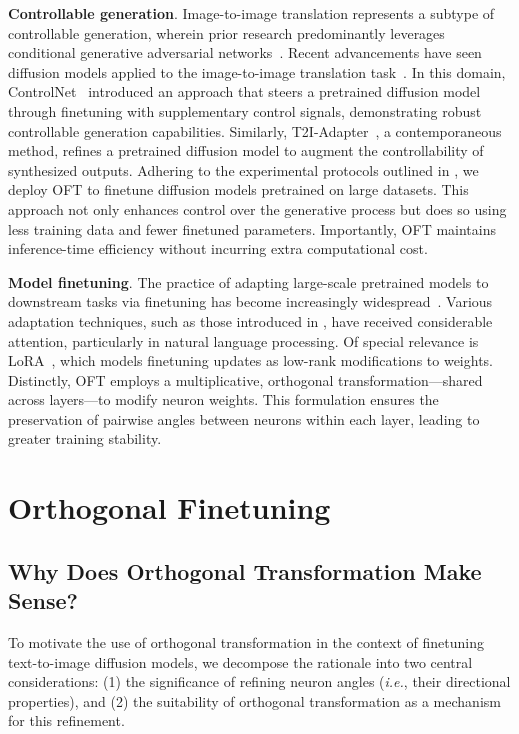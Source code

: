 \textbf{Controllable generation}. Image-to-image translation represents a subtype of controllable generation, wherein prior research predominantly leverages conditional generative adversarial networks~\cite{isola2017image,zhu2017toward,wang2018high,park2019semantic,choi2018stargan}. Recent advancements have seen diffusion models applied to the image-to-image translation task~\cite{saharia2022palette,voynov2022sketch,wang2022pretraining}. In this domain, ControlNet~\cite{zhang2023adding} introduced an approach that steers a pretrained diffusion model through finetuning with supplementary control signals, demonstrating robust controllable generation capabilities. Similarly, T2I-Adapter~\cite{mou2023t2i}, a contemporaneous method, refines a pretrained diffusion model to augment the controllability of synthesized outputs. Adhering to the experimental protocols outlined in \cite{zhang2023adding,mou2023t2i}, we deploy OFT to finetune diffusion models pretrained on large datasets. This approach not only enhances control over the generative process but does so using less training data and fewer finetuned parameters. Importantly, OFT maintains inference-time efficiency without incurring extra computational cost.

\textbf{Model finetuning}. The practice of adapting large-scale pretrained models to downstream tasks via finetuning has become increasingly widespread~\cite{devlin2018bert,brown2020language,he2022masked}. Various adaptation techniques, such as those introduced in \cite{hulora2022,houlsby2019parameter,pfeiffer2020adapterfusion}, have received considerable attention, particularly in natural language processing. Of special relevance is LoRA~\cite{hulora2022}, which models finetuning updates as low-rank modifications to weights. Distinctly, OFT employs a multiplicative, orthogonal transformation—shared across layers—to modify neuron weights. This formulation ensures the preservation of pairwise angles between neurons within each layer, leading to greater training stability.

\section{Orthogonal Finetuning}

\subsection{Why Does Orthogonal Transformation Make Sense?}

To motivate the use of orthogonal transformation in the context of finetuning text-to-image diffusion models, we decompose the rationale into two central considerations: (1) the significance of refining neuron angles (\emph{i.e.}, their directional properties), and (2) the suitability of orthogonal transformation as a mechanism for this refinement.

